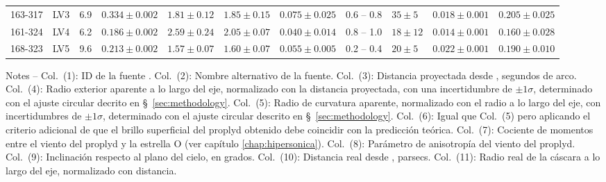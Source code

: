 \begin{table}
\begin{tabular}{llrllllrlll}
 163-317  & LV3      &   6.9  &  $0.334 \pm 0.002$  &  $1.81 \pm 0.12$   &  $1.85 \pm 0.15$     &  $0.075 \pm 0.025$  &  0.6 -- 0.8  &  $35 \pm 5$   &  $0.018 \pm 0.001$  &  $0.205 \pm 0.025$  \\
 161-324  & LV4      &   6.2  &  $0.186 \pm 0.002$  &  $2.59 \pm 0.24$   &  $2.05 \pm 0.07$     &  $0.040 \pm 0.014$  &  0.8 -- 1.0  &  $18 \pm 12$  &  $0.014 \pm 0.001$  &  $0.160 \pm 0.028$  \\
 168-323  & LV5      &   9.6  &  $0.213 \pm 0.002$  &  $1.57 \pm 0.07$   &  $1.60 \pm 0.07$     &  $0.055 \pm 0.005$  &  0.2 -- 0.4  &  $20 \pm 5$   &  $0.022 \pm 0.001$  &  $0.190 \pm 0.010$  \\
\bottomrule
\end{tabular}
\begin{minipage}{0.95\linewidth}
  Notes --
%
  Col.~(1): ID de la fuente \citep{ODell:1994a}.
%
  Col.~(2): Nombre alternativo de la fuente.
% 
  Col.~(3): Distancia proyectada desde \thC{}, segundos de arco.
%
  Col.~(4): Radio exterior aparente a lo largo del eje, normalizado con la distancia proyectada, con una incertidumbre de \(\pm 1\sigma\), determinado con el ajuste circular decrito en \S~\ref{sec:methodology}.
% 
  Col.~(5): Radio de curvatura aparente, normalizado con el radio a lo largo del eje, con incertidumbres de \(\pm 1\sigma\), determinado con el ajuste circular descrito en \S~\ref{sec:methodology}.
% 
  Col.~(6): Igual que Col.~(5) pero aplicando el criterio adicional de que el brillo superficial del proplyd obtenido debe coincidir con la predicción teórica.
%
  Col.~(7): Cociente de momentos entre el viento del proplyd y la estrella O (ver capítulo \ref{chap:hipersonica}). 
% 
  Col.~(8): Parámetro de anisotropía del viento del proplyd.
% 
  Col.~(9): Inclinación respecto al plano del cielo, en grados.
% 
  Col.~(10): Distancia real desde \thC{}, parsecs.
%
  Col.~(11): Radio real de la cáscara a lo largo del eje, normalizado con distancia.

\end{minipage}
\end{table}
